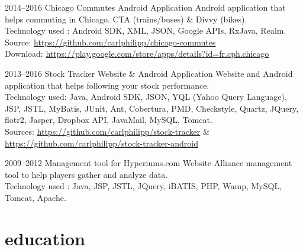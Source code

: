 \documentclass[]{friggeri-cv} %
\begin{document}
\begin{entrylist}

\entry
{2014--2016}
{}
{Chicago Commutes}
{  Android Application}
{}
{Android application that helps commuting in Chicago. CTA (trains/buses) \& Divvy (bikes).\\
Technology used : Android SDK, XML, JSON, Google APIs, RxJava, Realm.\\
\footnotesize{Source: \href{https://github.com/carlphilipp/chicago-commutes}{https://github.com/carlphilipp/chicago-commutes}}\\
\footnotesize{Download: \href{https://play.google.com/store/apps/details?id=fr.cph.chicago}{https://play.google.com/store/apps/details?id=fr.cph.chicago}}}

\end{entrylist}

\begin{entrylist}

\entry
{2013--2016}
{}
{Stock Tracker}
{  Website \& Android Application}
{}
{Website and Android application that helps following your stock performance.\\
Technology used: Java, Android SDK, JSON, YQL (Yahoo Query Language), JSP, JSTL, MyBatis,
JUnit, Ant, Cobertura, PMD, Checkstyle, Quartz, JQuery, flotr2, Jasper, Dropbox API, JavaMail,
MySQL, Tomcat.\\
\footnotesize{Sources: \href{https://github.com/carlphilipp/stock-tracker}{https://github.com/carlphilipp/stock-tracker} \& \href{https://github.com/carlphilipp/stock-tracker}{https://github.com/carlphilipp/stock-tracker-android}}}

\end{entrylist}

\begin{entrylist}

\entry
{2009--2012}
{}
{Management tool for Hyperiums.com}
{Website}
{}
{Alliance management tool to help players gather and analyze data.\\
Technology used : Java, JSP, JSTL, JQuery, iBATIS, PHP, Wamp, MySQL, Tomcat, Apache.}

\end{entrylist}


\section{education}
\end{document}
